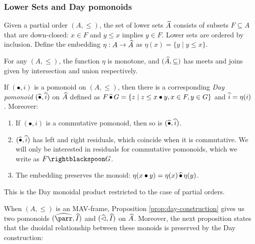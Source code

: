 \subsubsection{Lower Sets and Day pomonoids}
\label{sec:lower-sets}

\begin{definition}
  Given a partial order $(A, \leq)$, the set of lower sets
  $\widehat{A}$ consists of subsets $F \subseteq A$ that are
  down-closed: $x \in F$ and $y \leq x$ implies $y \in F$. Lower sets
  are ordered by inclusion. Define the embedding
  $\eta : A \to \widehat{A}$ as $\eta(x) = \{ y \mid y \leq x \}$.
\end{definition}

\begin{proposition}
  For any $(A, \leq)$, the function $\eta$ is monotone, and
  $(\widehat{A}, \subseteq)$ has meets and joins given by
  intersection and union respectively.
%
\end{proposition}

\begin{proposition}\label{prop:day-construction}
  If $(\bullet, i)$ is a pomonoid on $(A, \leq)$, then there is a
  corresponding \emph{Day pomonoid} $(\mathop{\widehat{\bullet}}, \mathop{\widehat{i}})$ on
  $\widehat{A}$ defined as
  $F \mathop{\widehat{\bullet}} G = \{ z \mid z \leq x \bullet y, x \in F, y \in G
  \}$ and $\mathop{\widehat{i}} = \eta(i)$. Moreover:
  \begin{enumerate}
  \item If $(\bullet, i)$ is a commutative pomonoid, then so is
    $(\mathop{\widehat{\bullet}}, \mathop{\widehat{i}})$.
  \item $(\mathop{\widehat{\bullet}}, \mathop{\widehat{i}})$ has left and right residuals, which
    coincide when it is commutative. We will only be interested in
    residuals for commutative pomonoids, which we write as
    $F \rightblackspoon G$.
  \item The embedding preserves the monoid:
    $\eta(x \bullet y) = \eta(x) \mathop{\widehat{\bullet}} \eta(y)$.
  \end{enumerate}
\end{proposition}

\begin{remark}
  This is the Day monoidal product \cite{day} restricted to the case
  of partial orders.
\end{remark}

\begin{remark}
  When $(A, \leq)$ is an MAV-frame, Proposition
  \ref{prop:day-construction} gives us two pomonoids
  $(\Day{\parr}, \Day{I})$ and $(\mathop{\widehat{\lhd}}, \mathop{\widehat{I}})$ on
  $\widehat{A}$. Moreover, the next proposition states that the
  duoidal relationship between these monoids is preserved by the Day
  construction:
\end{remark}

